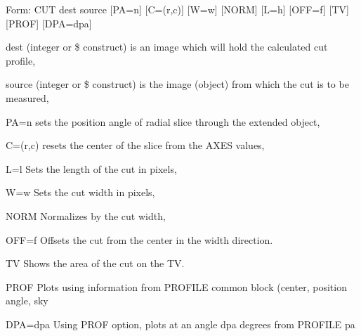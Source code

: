 {\newpage\clearpage
{}%
\begin{command}
  \item[Form: CUT dest source {[PA=n]} {[C=(r,c)]} {[W=w]} {[NORM]} {[L=h]}
       {[OFF=f]} {[TV]} {[PROF]} {[DPA=dpa]} \hfill]{}
  \item[dest]{(integer or \$ construct) is an image which
       will hold the calculated cut profile,}
  \item[source]{(integer or \$ construct) is the image (object)
       from which the cut is to be measured,}
  \item[PA=n]{sets the position angle of radial slice through the 
       extended object,}
  \item[C=(r,c)]{resets the center of the slice from the AXES values,}
  \item[L=l]{Sets the length of the cut in pixels,}
  \item[W=w]{Sets the cut width in pixels,}
  \item[NORM]{Normalizes by the cut width,}
  \item[OFF=f]{Offsets the cut from the center in the width direction.}
  \item[TV]{Shows the area of the cut on the TV.}
  \item[PROF]{Plots using information from PROFILE common block (center, 
        position angle, sky}
  \item[DPA=dpa]{Using PROF option, plots at an angle dpa degrees from
        PROFILE pa}
\end{command}%
\lthtmlfigureZ
\lthtmlcheckvsize\clearpage}

